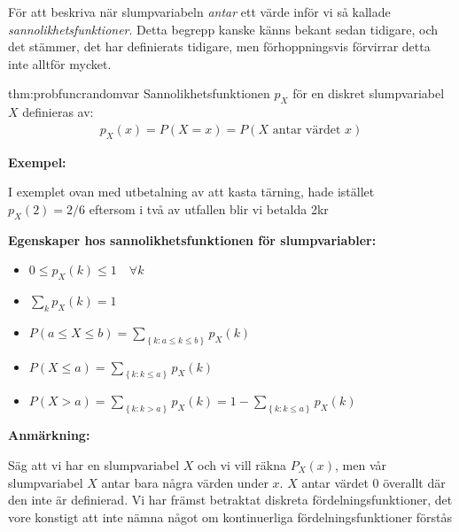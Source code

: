 \noindent För att beskriva när slumpvariabeln \textit{antar} ett värde inför vi så kallade \textit{sannolikhetsfunktioner}. Detta begrepp kanske känns bekant sedan tidigare, och det stämmer, det har definierats tidigare, men förhoppningsvis förvirrar detta inte alltför mycket.
\par\bigskip
\begin{theo}{thm:probfuncrandomvar}
  Sannolikhetsfunktionen $p_X$ för en diskret slumpvariabel $X$ definieras av:
  \begin{equation*}
    \begin{gathered}
      p_X(x) = P(X=x) = P(X \text{ antar värdet } x)
    \end{gathered}
  \end{equation*}
\end{theo}
\par\bigskip
\noindent\textbf{Exempel:}\par
\noindent I exemplet ovan med utbetalning av att kasta tärning, hade istället $p_X(2) = 2/6$ eftersom i två av utfallen blir vi betalda 2kr
\par\bigskip
\noindent\textbf{Egenskaper hos sannolikhetsfunktionen för slumpvariabler:}
\begin{itemize}
  \item $0\leq p_X(k)\leq1\quad\forall k$
  \item $\sum_kp_X(k) = 1$
  \item $P(a\leq X\leq b) = \sum_{\left\{k:a\leq k\leq b\right\}}p_X(k)$
  \item $P(X\leq a) = \sum_{\left\{k:k\leq a\right\}}p_X(k)$
  \item $P(X>a) = \sum_{\left\{k:k>a\right\}}p_X(k) = 1-\sum_{\left\{k:k\leq a\right\}}p_X(k)$
\end{itemize}
\par\bigskip
\noindent\textbf{Anmärkning:}\par
\noindent Säg att vi har en slumpvariabel $X$ och vi vill räkna $P_X(x)$, men vår slumpvariabel $X$ antar bara några värden under $x$. $X$ antar värdet 0 överallt där den inte är definierad. 
\noindent Vi har främst betraktat diskreta fördelningsfunktioner, det vore konstigt att inte nämna något om kontinuerliga fördelningsfunktioner förstås 
